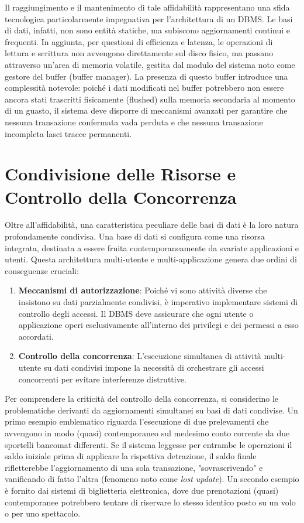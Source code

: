 Il raggiungimento e il mantenimento di tale affidabilità rappresentano una sfida tecnologica particolarmente impegnativa per l'architettura di un DBMS. Le basi di dati, infatti, non sono entità statiche, ma subiscono aggiornamenti continui e frequenti. In aggiunta, per questioni di efficienza e latenza, le operazioni di lettura e scrittura non avvengono direttamente sul disco fisico, ma passano attraverso un'area di memoria volatile, gestita dal modulo del sistema noto come gestore del buffer (buffer manager). La presenza di questo buffer introduce una complessità notevole: poiché i dati modificati nel buffer potrebbero non essere ancora stati trascritti fisicamente (flushed) sulla memoria secondaria al momento di un guasto, il sistema deve disporre di meccanismi avanzati per garantire che nessuna transazione confermata vada perduta e che nessuna transazione incompleta lasci tracce permanenti.

\section{Condivisione delle Risorse e Controllo della Concorrenza}

Oltre all'affidabilità, una caratteristica peculiare delle basi di dati è la loro natura profondamente condivisa. Una base di dati si configura come una risorsa integrata, destinata a essere fruita contemporaneamente da svariate applicazioni e utenti. Questa architettura multi-utente e multi-applicazione genera due ordini di conseguenze cruciali:
\begin{enumerate}
    \item \textbf{Meccanismi di autorizzazione}: Poiché vi sono attività diverse che insistono su dati parzialmente condivisi, è imperativo implementare sistemi di controllo degli accessi. Il DBMS deve assicurare che ogni utente o applicazione operi esclusivamente all'interno dei privilegi e dei permessi a esso accordati.
    \item \textbf{Controllo della concorrenza}: L'esecuzione simultanea di attività multi-utente su dati condivisi impone la necessità di orchestrare gli accessi concorrenti per evitare interferenze distruttive.
\end{enumerate}

Per comprendere la criticità del controllo della concorrenza, si considerino le problematiche derivanti da aggiornamenti simultanei su basi di dati condivise. Un primo esempio emblematico riguarda l'esecuzione di due prelevamenti che avvengono in modo (quasi) contemporaneo sul medesimo conto corrente da due sportelli bancomat differenti. Se il sistema leggesse per entrambe le operazioni il saldo iniziale prima di applicare la rispettiva detrazione, il saldo finale rifletterebbe l'aggiornamento di una sola transazione, "sovrascrivendo" e vanificando di fatto l'altra (fenomeno noto come \textit{lost update}). Un secondo esempio è fornito dai sistemi di biglietteria elettronica, dove due prenotazioni (quasi) contemporanee potrebbero tentare di riservare lo stesso identico posto su un volo o per uno spettacolo.

